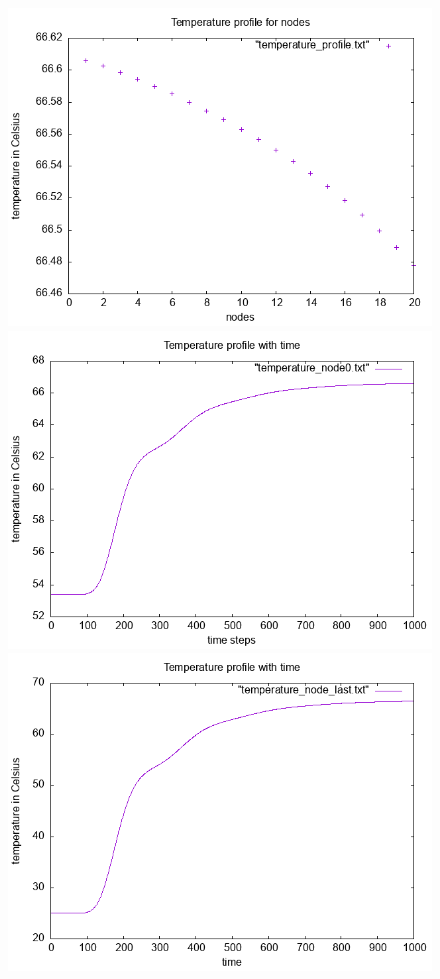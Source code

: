\documentclass{article}
\begin{document}
\begin{figure}[ht]
\centering
\includegraphics[scale = 0.5]{figures/temperature_profile_N_20_U_0.png}
\includegraphics[scale =0.5]{figures/temperature_node0_N_20_U_0.png}
\includegraphics[scale =0.5]{figures/temperature_node_last_N_20_U_0.png}

\end{figure}
\end{document}

